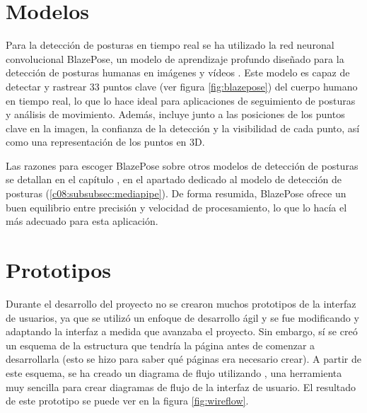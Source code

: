 \section{Modelos}
\label{sec:modelos}
Para la detección de posturas en tiempo real se ha utilizado la red neuronal
convolucional BlazePose, un modelo de aprendizaje profundo diseñado para la
detección de posturas humanas en imágenes y vídeos \parencites%
{bazarevsky2020blazepose}{xu2020ghum}. Este modelo es capaz de
detectar y rastrear 33 puntos clave (ver figura \ref{fig:blazepose}) del cuerpo
humano en tiempo real, lo que lo hace ideal para aplicaciones de seguimiento de
posturas y análisis de movimiento.  Además, incluye junto a las posiciones de
los puntos clave en la imagen, la confianza de la detección y la visibilidad de
cada punto, así como una representación de los puntos en 3D.

Las razones para escoger BlazePose sobre otros modelos de detección de posturas
se detallan en el capítulo \textit{},
en el apartado dedicado al modelo de detección de posturas
(\ref{c08:subsubsec:mediapipe}). De forma resumida, BlazePose ofrece un buen
equilibrio entre precisión y velocidad de procesamiento, lo que lo hacía
el más adecuado para esta aplicación.


\section{Prototipos}
\label{sec:prototipos}
Durante el desarrollo del proyecto no se crearon muchos prototipos de la
interfaz de usuarios, ya que se utilizó un enfoque de desarrollo ágil y se fue
modificando y adaptando la interfaz a medida que avanzaba el proyecto. Sin
embargo, sí se creó un esquema de la estructura que tendría la página antes de
comenzar a desarrollarla (esto se hizo para saber qué páginas era necesario
crear). A partir de este esquema, se ha creado un diagrama de flujo utilizando
, una herramienta muy sencilla para
crear diagramas de flujo de la interfaz de usuario. El resultado de este
prototipo se puede ver en la figura \ref{fig:wireflow}.


